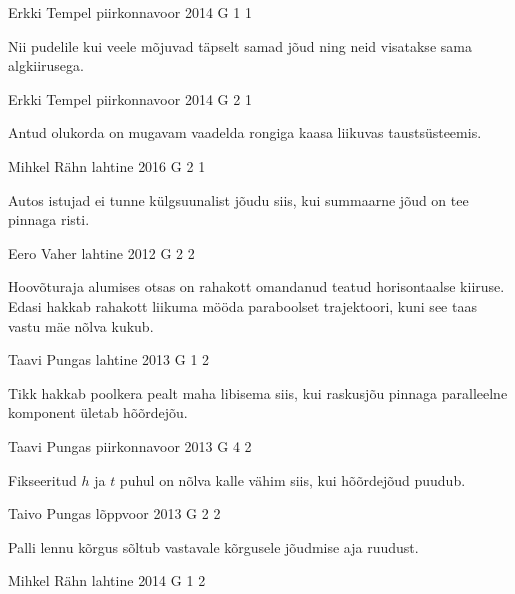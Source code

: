\documentclass[11pt]{article}
\begin{document}
{%
{Erkki Tempel} %
{piirkonnavoor} %
{2014} %
{G 1} %
{1} %
{

\ifHint
Nii pudelile kui veele mõjuvad täpselt samad jõud ning neid visatakse sama algkiirusega.
\fi
}

{Erkki Tempel} %
{piirkonnavoor} %
{2014} %
{G 2} %
{1} %
{

\ifHint
Antud olukorda on mugavam vaadelda rongiga kaasa liikuvas taustsüsteemis.
\fi
}

{Mihkel Rähn} %
{lahtine} %
{2016} %
{G 2} %
{1} %
{

\ifHint
Autos istujad ei tunne külgsuunalist jõudu siis, kui summaarne jõud on tee pinnaga risti.
\fi
}

{Eero Vaher} %
{lahtine} %
{2012} %
{G 2} %
{2} %
{

\ifHint
Hoovõturaja alumises otsas on rahakott omandanud teatud horisontaalse kiiruse. Edasi hakkab rahakott liikuma mööda paraboolset trajektoori, kuni see taas vastu mäe nõlva kukub.
\fi
}

{Taavi Pungas} %
{lahtine} %
{2013} %
{G 1} %
{2} %
{

\ifHint
Tikk hakkab poolkera pealt maha libisema siis, kui raskusjõu pinnaga paralleelne komponent ületab hõõrdejõu.
\fi
}

{Taavi Pungas} %
{piirkonnavoor} %
{2013} %
{G 4} %
{2} %
{

\ifHint
Fikseeritud $h$ ja $t$ puhul on nõlva kalle vähim siis, kui hõõrdejõud puudub.
\fi
}

{Taivo Pungas} %
{lõppvoor} %
{2013} %
{G 2} %
{2} %
{

\ifHint
Palli lennu kõrgus sõltub vastavale kõrgusele jõudmise aja ruudust.
\fi
}

{Mihkel Rähn} %
{lahtine} %
{2014} %
{G 1} %
{2} %
{

}}
\end{document}
